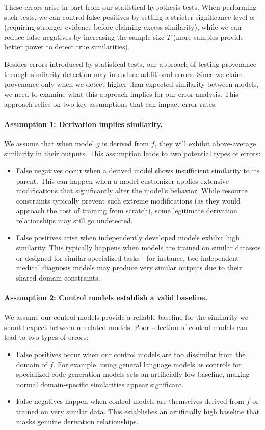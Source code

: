 These errors arise in part from our statistical hypothesis tests. When performing such tests, we can control false positives by setting a stricter significance level $\alpha$ (requiring stronger evidence before claiming excess similarity), while we can reduce false negatives by increasing the sample size $T$ (more samples provide better power to detect true similarities).

Besides errors introduced by statistical tests, our approach of testing provenance through similarity detection may introduce additional errors. Since we claim provenance only when we detect higher-than-expected similarity between models, we need to examine what this approach implies for our error analysis.
%
This approach relies on two key assumptions that can impact error rates:
\paragraph{Assumption 1: Derivation implies similarity.}
We assume that when model $g$ is derived from $f$, they will exhibit above-average similarity in their outputs. This assumption leads to two potential types of errors:
\begin{itemize}
\item
False negatives occur when a derived model shows insufficient similarity to its parent. This can happen when a model customizer applies extensive modifications that significantly alter the model's behavior. While resource constraints typically prevent such extreme modifications (as they would approach the cost of training from scratch), some legitimate derivation relationships may still go undetected.
\item
False positives arise when independently developed models exhibit high similarity. This typically happens when models are trained on similar datasets or designed for similar specialized tasks - for instance, two independent medical diagnosis models may produce very similar outputs due to their shared domain constraints.
\end{itemize}
\paragraph{Assumption 2: Control models establish a valid baseline.} 
We assume our control models provide a reliable baseline for the similarity we should expect between unrelated models. Poor selection of control models can lead to two types of errors:
\begin{itemize}
\item
False positives occur when our control models are too dissimilar from the domain of $f$. For example, using general language models as controls for specialized code generation models sets an artificially low baseline, making normal domain-specific similarities appear significant.
\item
False negatives happen when control models are themselves derived from $f$ or trained on very similar data. This establishes an artificially high baseline that masks genuine derivation relationships.
\end{itemize}

